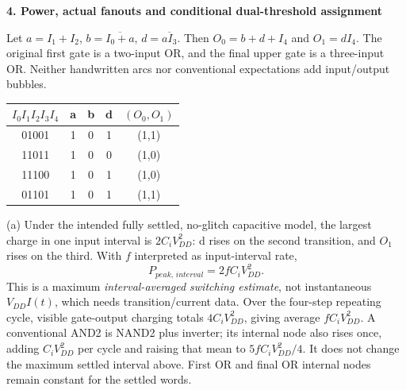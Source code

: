 \documentclass[10pt]{article}
\newcommand{\grd}[2]{\draw(#1,#2)--(#1,#2-.12);\draw(#1-.15,#2-.12)--(#1+.15,#2-.12);\draw(#1-.1,#2-.19)--(#1+.1,#2-.19);}
\begin{document}
\newpage\textbf{4. Power, actual fanouts and conditional dual-threshold assignment}
\begin{center}\end{center}
Let $a=I_1+I_2$, $b=\overline{I_0+a}$, $d=\overline{aI_3}$. Then $O_0=b+d+I_4$ and $O_1=dI_4$. The original first gate is a two-input OR, and the final upper gate is a three-input OR. Neither handwritten arcs nor conventional expectations add input/output bubbles.
\begin{center}\begin{tabular}{ccccc}\toprule $I_0I_1I_2I_3I_4$&a&b&d&$(O_0,O_1)$\\\midrule01001&1&0&1&(1,1)\\11011&1&0&0&(1,0)\\11100&1&0&1&(1,0)\\01101&1&0&1&(1,1)\\\bottomrule\end{tabular}\end{center}
(a) Under the intended fully settled, no-glitch capacitive model, the largest charge in one input interval is $2C_iV_{DD}^2$: d rises on the second transition, and $O_1$ rises on the third. With $f$ interpreted as input-interval rate,
\[\boxed{P_{peak,\,interval}=2fC_iV_{DD}^2.}\]
This is a maximum \emph{interval-averaged switching estimate}, not instantaneous $V_{DD}I(t)$, which needs transition/current data. Over the four-step repeating cycle, visible gate-output charging totals $4C_iV_{DD}^2$, giving average $fC_iV_{DD}^2$. A conventional AND2 is NAND2 plus inverter; its internal node also rises once, adding $C_iV_{DD}^2$ per cycle and raising that mean to $5fC_iV_{DD}^2/4$. It does not change the maximum settled interval above. First OR and final OR internal nodes remain constant for the settled words.
\end{document}
